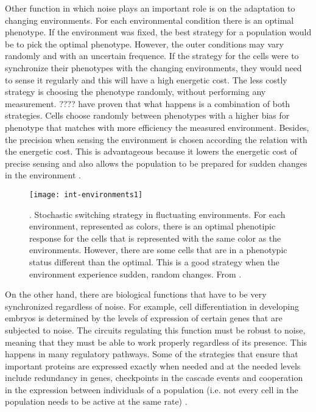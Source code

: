 Other function in which noise plays an important role is on the adaptation to changing environments. For each environmental condition there is an optimal phenotype. If the environment was fixed, the best strategy for a population would be to pick the optimal phenotype. However, the outer conditions may vary randomly and with an uncertain frequence. If the strategy for the cells were to synchronize their phenotypes with the changing environments, they would need to sense it regularly and this will have a high energetic cost. The less costly strategy is choosing the phenotype randomly, without performing any measurement. ???? have proven that what happens is a combination of both strategies. Cells choose randomly between phenotypes with a higher bias for phenotype that matches with more efficiency the measured environment. Besides, the precision when sensing the environment is chosen according the relation with the energetic cost. This is advantageous because it lowers the energetic cost of precise sensing and also allows the population to be prepared for sudden changes in the environment \cite{kussell05}.

\begin{figure}[H]
  \centering
  \texttt{[image: int-environments1]}
  \caption[Stochastic switching strategy in fluctuating environments]{\label{fig:int-environments1}. Stochastic switching strategy in fluctuating environments. For each environment, represented as colors, there is an optimal phenotipic response for the cells that is represented with the same color as the environments. However, there are some cells that are in a phenotypic status different than the optimal. This is a good strategy when the environment experience sudden, random changes. From \cite{kussell05}.}
\end{figure}

On the other hand, there are biological functions that have to be very synchronized regardless of noise. For example, cell differentiation in developing embryos is determined by the levels of expression of certain genes that are subjected to noise. The circuits regulating this function must be robust to noise, meaning that they must be able to work properly regardless of its presence. This happens in many regulatory pathways. Some of the strategies that ensure that important proteins are expressed exactly when needed and at the needed levels include redundancy in genes, checkpoints in the cascade events and cooperation in the expression between individuals of a population (i.e. not every cell in the population needs to be active at the same rate) \cite{mcadams99}.


